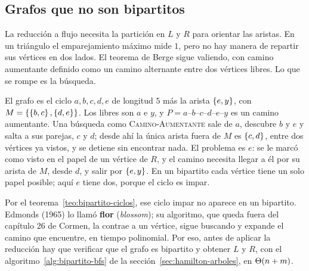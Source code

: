 \documentclass[11pt,letterpaper]{article}
\begin{document}

\subsection*{Grafos que no son bipartitos}

La reducción a flujo necesita la partición en $L$ y $R$ para orientar
las aristas. En un triángulo el emparejamiento máximo mide $1$, pero
no hay manera de repartir sus vértices en dos lados. El teorema de
Berge sigue valiendo, con camino aumentante definido como un camino
alternante entre dos vértices libres. Lo que se rompe es la búsqueda.

\begin{ejemplo}
  \label{ej:emparejamiento-flor}
  El grafo es el ciclo $a, b, c, d, e$ de longitud $5$ más la arista
  $\left\{ e, y \right\}$, con $M = \left\{ \left\{ b,c \right\}, \left\{ d,e \right\} \right\}$. Los libres son
  $a$ e $y$, y $P = a$--$b$--$c$--$d$--$e$--$y$ es un camino
  aumentante. Una búsqueda como \textsc{Camino-Aumentante} sale de
  $a$, descubre $b$ y $e$ y salta a sus parejas, $c$ y $d$; desde ahí
  la única arista fuera de $M$ es $\left\{ c, d \right\}$, entre dos vértices ya
  vistos, y se detiene sin encontrar nada. El problema es $e$: se le
  marcó como visto en el papel de un vértice de $R$, y el camino
  necesita llegar a él por su arista de $M$, desde $d$, y salir por
  $\left\{ e, y \right\}$. En un bipartito cada vértice tiene un solo papel
  posible; aquí $e$ tiene dos, porque el ciclo es impar.
\end{ejemplo}

Por el teorema~\ref{teo:bipartito-ciclos}, ese ciclo impar no aparece
en un bipartito. Edmonds (1965) lo llamó \textbf{flor}
(\textit{blossom}); su algoritmo, que queda fuera del capítulo 26 de
Cormen, la contrae a un vértice, sigue buscando y expande el camino
que encuentre, en tiempo polinomial. Por eso, antes de aplicar la
reducción hay que verificar que el grafo es bipartito y obtener $L$ y
$R$, con el algoritmo~\ref{alg:bipartito-bfs} de la
sección~\ref{sec:hamilton-arboles}, en $\Theta\!\left(n + m\right)$.

\newpage


\label{sec:push-relabel}
\end{document}
